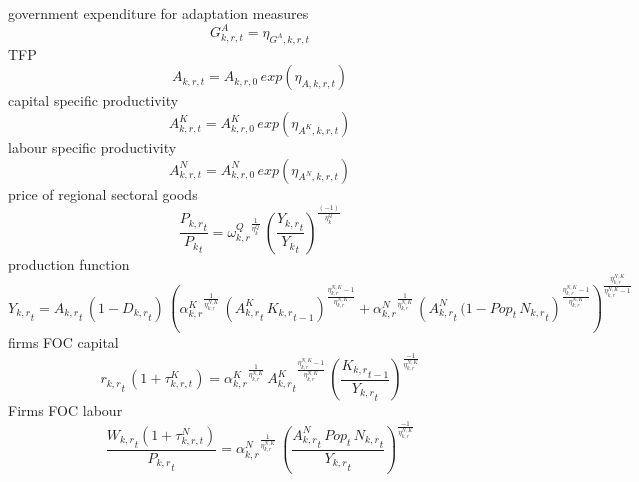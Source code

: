 government expenditure for adaptation measures
\begin{dmath}
G^{A}_{k,r,t}=\eta_{G^{A},k,r,t}
\end{dmath}
TFP
\begin{dmath}
A_{k,r,t}= A_{k,r,0} \, exp\left({\eta_{A,k,r,t}}\right)
\end{dmath}
capital specific productivity
\begin{dmath}
A^{K}_{k,r,t}= A^{K}_{k,r,0} \, exp\left({\eta_{A^{K},k,r,t}}\right)
\end{dmath}
labour specific productivity
\begin{dmath}
A^{N}_{k,r,t}= A^{N}_{k,r,0} \, exp\left({\eta_{A^{N},k,r,t}}\right)
\end{dmath}
price of regional sectoral goods
\begin{dmath}
\frac{{{P_{k,r}}_{t}}}{{{P_k}_{t}}}={{\omega^{Q}_{k,r}}}^{\frac{1}{{{\eta^{Q}_{k}}}}}\, \left(\frac{{{Y_{k,r}}_{t}}}{{{Y_k}_{t}}}\right)^{\frac{\left(-1\right)}{{{\eta^{Q}_{k}}}}}
\end{dmath}
production function
\begin{dmath}
{{Y_{k,r}}_{t}}={{A_{k,r}}_{t}}\, \left(1-{{D_{k,r}}_{t}}\right)\, \left({{\alpha^{K}_{k,r}}}^{\frac{1}{{{\eta^{N,K}_{k,r}}}}}\, \left({{A^{K}_{k,r}}_{t}}\, {{K_{k,r}}_{t-1}}\right)^{\frac{{{\eta^{N,K}_{k,r}}}-1}{{{\eta^{N,K}_{k,r}}}}}+{{\alpha^{N}_{k,r}}}^{\frac{1}{{{\eta^{N,K}_{k,r}}}}}\, \left({{A^{N}_{k,r}}_{t}}\, (1 -  {Pop_{t}}\, {{N_{k,r}}_{t}}\right)^{\frac{{{\eta^{N,K}_{k,r}}}-1}{{{\eta^{N,K}_{k,r}}}}}\right)^{\frac{{{\eta^{N,K}_{k,r}}}}{{{\eta^{N,K}_{k,r}}}-1}}
\end{dmath}
firms FOC capital
\begin{dmath}
{{r_{k,r}}_{t}} \, \left(1+\tau^{K}_{k,r,t}\right)={{\alpha^{K}_{k,r}}}^{\frac{1}{{{\eta^{N,K}_{k,r}}}}}\, {{A^{K}_{k,r}}_{t}}^{\frac{{{\eta^{N,K}_{k,r}}}-1}{{{\eta^{N,K}_{k,r}}}}}\, \left(\frac{{{K_{k,r}}_{t-1}}}{{{Y_{k,r}}_{t}}}\right)^{\frac{-1}{{{\eta^{N,K}_{k,r}}}}}
\end{dmath}
Firms FOC labour
\begin{dmath}
\frac{{{W_{k,r}}_{t}}\left(1+\tau^{N}_{k,r,t}\right)}{{{P_{k,r}}_{t}}}={{\alpha^{N}_{k,r}}}^{\frac{1}{{{\eta^{N,K}_{k,r}}}}}\, \left(\frac{{{A^{N}_{k,r}}_{t}}\, {Pop_{t}}\, {{N_{k,r}}_{t}}}{{{Y_{k,r}}_{t}}}\right)^{\frac{-1}{{{\eta^{N,K}_{k,r}}}}}
\end{dmath}

